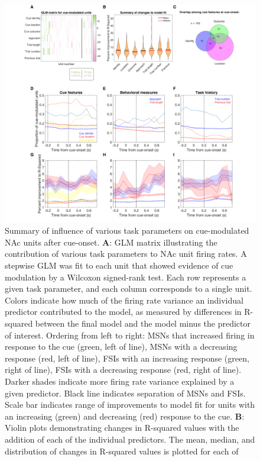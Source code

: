 \documentclass[11pt]{article}
\newcommand{\bsf}[1]{\textbf{#1}}
\begin{document}
{\begin{figure}[h]
\centering
\includegraphics[height=0.5\textheight]{Fig 6 - GLM.png}
\caption{Summary of influence of various task parameters on cue-modulated NAc
units after cue-onset. \bsf{A}: GLM matrix illustrating the contribution of
various task parameters to NAc unit firing rates. A stepwise GLM was fit to
each unit that showed evidence of cue modulation by a Wilcoxon signed-rank
test. Each row represents a given task parameter, and each column corresponds
to a single unit. Colors indicate how much of the firing rate variance an
individual predictor contributed to the model, as measured by differences in
R-squared between the final model and the model minus the predictor of
interest. Ordering from left to right: MSNs that increased firing in response
to the cue (green, left of line), MSNs with a decreasing response (red, left
of line), FSIs with an increasing response (green, right of line), FSIs with a
decreasing response (red, right of line). Darker shades indicate more firing
rate variance explained by a given predictor. Black line indicates separation
of MSNs and FSIs. Scale bar indicates range of improvements to model fit for units with an increasing (green) and decreasing (red) response to the cue. \bsf{B}: Violin plots demonstrating changes in R-squared
values with the addition of each of the individual predictors. The mean,
median, and distribution of changes in R-squared values is plotted for each of
}
\end{figure}}
\end{document}
